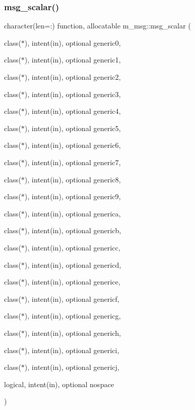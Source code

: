 \subsubsection{\texorpdfstring{msg\+\_\+scalar()}{msg\_scalar()}}
{\footnotesize\ttfamily character(len=\+:) function, allocatable m\+\_\+msg\+::msg\+\_\+scalar (\begin{DoxyParamCaption}\item[{class($\ast$), intent(in), optional}]{generic0,  }\item[{class($\ast$), intent(in), optional}]{generic1,  }\item[{class($\ast$), intent(in), optional}]{generic2,  }\item[{class($\ast$), intent(in), optional}]{generic3,  }\item[{class($\ast$), intent(in), optional}]{generic4,  }\item[{class($\ast$), intent(in), optional}]{generic5,  }\item[{class($\ast$), intent(in), optional}]{generic6,  }\item[{class($\ast$), intent(in), optional}]{generic7,  }\item[{class($\ast$), intent(in), optional}]{generic8,  }\item[{class($\ast$), intent(in), optional}]{generic9,  }\item[{class($\ast$), intent(in), optional}]{generica,  }\item[{class($\ast$), intent(in), optional}]{genericb,  }\item[{class($\ast$), intent(in), optional}]{genericc,  }\item[{class($\ast$), intent(in), optional}]{genericd,  }\item[{class($\ast$), intent(in), optional}]{generice,  }\item[{class($\ast$), intent(in), optional}]{genericf,  }\item[{class($\ast$), intent(in), optional}]{genericg,  }\item[{class($\ast$), intent(in), optional}]{generich,  }\item[{class($\ast$), intent(in), optional}]{generici,  }\item[{class($\ast$), intent(in), optional}]{genericj,  }\item[{logical, intent(in), optional}]{nospace }\end{DoxyParamCaption})\hspace{0.3cm}{\ttfamily [private]}}



